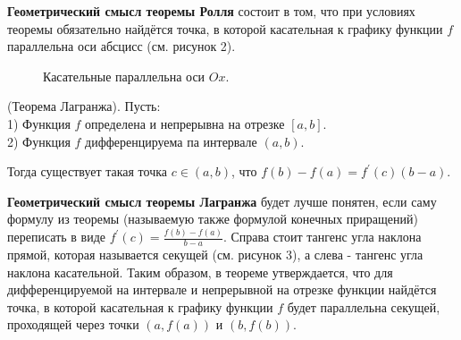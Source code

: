 \textbf{Геометрический смысл теоремы Ролля}
состоит в том, что при условиях теоремы обязательно найдётся точка, в которой касательная к графику функции
$f$
параллельна оси
абсцисс (см. рисунок 2).

\begin{figure}[h!]
    \caption{Касательные параллельна оси $Ox$.}
    \label{fig:image}
\end{figure}

\begin{theorem}
    (Теорема Лагранжа). Пусть:\\
    1) Функция $f$ определена и непрерывна на отрезке $[a, b]$.\\
    2) Функция $f$ дифференцируема па интервале $(a, b)$.

    Тогда существует такая точка $c \in(a, b)$, что $f(b)-f(a)=f^{\prime}(c)(b-a)$.
\end{theorem}

\textbf{Геометрический смысл теоремы Лагранжа} будет лучше понятен, если саму формулу из теоремы (называемую также формулой конечных приращений) переписать в виде $f^{\prime}(c)=\frac{f(b)-f(a)}{b-a}$. Справа стоит тангенс угла наклона прямой, которая называется секущей (см. рисунок 3), а слева - тангенс угла наклона касательной. Таким образом, в теореме утверждается, что для дифференцируемой на интервале и непрерывной на отрезке функции найдётся точка, в которой касательная к графику функции $f$ будет параллельна секущей, проходящей через точки $(a, f(a))$ и $(b, f(b))$.

